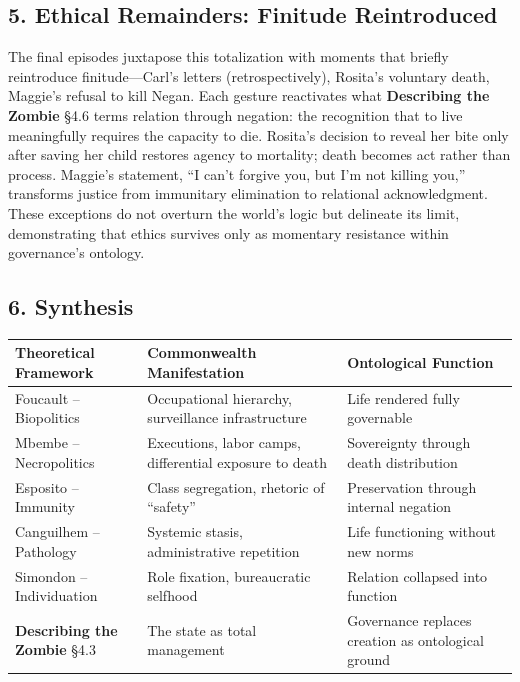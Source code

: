\documentclass[11pt]{article}
\begin{document}
\subsection*{5. Ethical Remainders: Finitude Reintroduced}
\label{sec:orgd9a50cc}

The final episodes juxtapose this totalization with moments that briefly reintroduce finitude—Carl’s letters (retrospectively), Rosita’s voluntary death, Maggie’s refusal to kill Negan.  Each gesture reactivates what \textbf{Describing the Zombie} §4.6 terms relation through negation: the recognition that to live meaningfully requires the capacity to die.  Rosita’s decision to reveal her bite only after saving her child restores agency to mortality; death becomes act rather than process.  Maggie’s statement, “I can’t forgive you, but I’m not killing you,” transforms justice from immunitary elimination to relational acknowledgment.  These exceptions do not overturn the world’s logic but delineate its limit, demonstrating that ethics survives only as momentary resistance within governance’s ontology.  
\subsection*{6. Synthesis}
\label{sec:org902c866}

\begin{center}
\begin{tabular}{lll}
Theoretical Framework & Commonwealth Manifestation & Ontological Function\\
\hline
Foucault – Biopolitics & Occupational hierarchy, surveillance infrastructure & Life rendered fully governable\\
Mbembe – Necropolitics & Executions, labor camps, differential exposure to death & Sovereignty through death distribution\\
Esposito – Immunity & Class segregation, rhetoric of “safety” & Preservation through internal negation\\
Canguilhem – Pathology & Systemic stasis, administrative repetition & Life functioning without new norms\\
Simondon – Individuation & Role fixation, bureaucratic selfhood & Relation collapsed into function\\
\textbf{Describing the Zombie} §4.3 & The state as total management & Governance replaces creation as ontological ground\\
\end{tabular}
\end{center}
\end{document}
